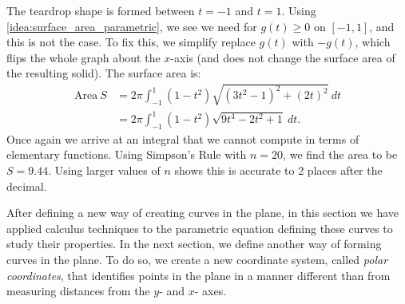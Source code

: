 {The teardrop shape is formed between $t=-1$ and $t=1$. Using \autoref{idea:surface_area_parametric}, we see we need for $g(t)\geq 0$ on $[-1,1]$, and this is not the case. To fix this, we simplify replace $g(t)$ with $-g(t)$, which flips the whole graph about the $x$-axis (and does not change the surface area of the resulting solid). The surface area is: 
\begin{align*}
\text{Area}\ S &= 2\pi\int_{-1}^1 (1-t^2)\sqrt{(3t^2-1)^2+(2t)^2}\ dt\\
		&=	2\pi\int_{-1}^1 (1-t^2)\sqrt{9t^4-2t^2+1} \ dt.
		\end{align*}
Once again we arrive at an integral that we cannot compute in terms of elementary functions. Using Simpson's Rule with $n=20$, we find the area to be $S=9.44$. Using larger values of $n$ shows this is accurate to 2 places after the decimal.
}

After defining a new way of creating curves in the plane, in this section we have applied calculus techniques to the parametric equation defining these curves to study their properties. In the next section, we define another way of forming curves in the plane. To do so, we create a new coordinate system, called \emph{polar coordinates}, that identifies points in the plane in a manner different than from measuring distances from the $y$- and $x$- axes.

